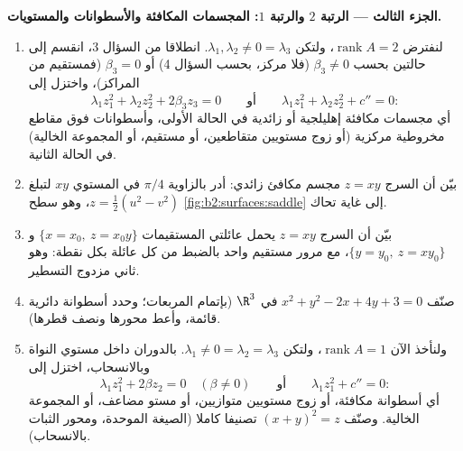 \begin{problem}
\medskip
\noindent\textbf{الجزء الثالث --- الرتبة $2$ والرتبة $1$:
المجسمات المكافئة والأسطوانات والمستويات.}
\begin{enumerate}[resume]
  \item لنفترض $\operatorname{rank}A = 2$، ولتكن $\lambda_1,
        \lambda_2 \neq 0 = \lambda_3$. انطلاقا من السؤال 3، انقسم
        إلى حالتين بحسب $\beta_3 \neq 0$ (فلا مركز، بحسب السؤال 4) أو $\beta_3 = 0$
        (فمستقيم من المراكز)، واختزل إلى
        \[
        \lambda_1z_1^2 + \lambda_2z_2^2 + 2\beta_3z_3 = 0
        \qquad\text{أو}\qquad
        \lambda_1z_1^2 + \lambda_2z_2^2 + c'' = 0 :
        \]
        أي مجسمات مكافئة إهليلجية أو زائدية في الحالة الأولى،
        وأسطوانات فوق مقاطع مخروطية مركزية (أو زوج مستويين
        متقاطعين، أو مستقيم، أو المجموعة الخالية) في الحالة الثانية.
  \item بيّن أن السرج $z = xy$ مجسم مكافئ زائدي: أدر بالزاوية $\pi/4$
        في المستوي $xy$ لتبلغ $z = \tfrac12(u^2 - v^2)$، وهو سطح \cref{fig:b2:surfaces:saddle} إلى غاية
        تحاك.
  \item بيّن أن السرج $z = xy$ يحمل عائلتي المستقيمات $\{x = x_0,\ z = x_0y\}$ و$\{y = y_0,\ z
        = xy_0\}$،
        مع مرور مستقيم واحد بالضبط من كل عائلة بكل نقطة: وهو ثاني
         مزدوج التسطير.
  \item صنّف $x^2 + y^2 - 2x + 4y + 3 = 0$ في $\R^3$ (بإتمام المربعات؛ وحدد أسطوانة
        دائرية قائمة، وأعط محورها ونصف قطرها).
  \item ولنأخذ الآن $\operatorname{rank}A = 1$، ولتكن $\lambda_1
        \neq 0 = \lambda_2 = \lambda_3$. بالدوران داخل مستوي
        النواة وبالانسحاب، اختزل إلى
        \[
        \lambda_1z_1^2 + 2\beta z_2 = 0 \quad (\beta \neq 0)
        \qquad\text{أو}\qquad
        \lambda_1z_1^2 + c'' = 0 :
        \]
        أي أسطوانة مكافئة، أو زوج مستويين متوازيين، أو مستو مضاعف،
        أو المجموعة الخالية. وصنّف $(x + y)^2 =
        z$ تصنيفا كاملا (الصيغة
        الموحدة، ومحور الثبات بالانسحاب).
\end{enumerate}


\end{problem}
